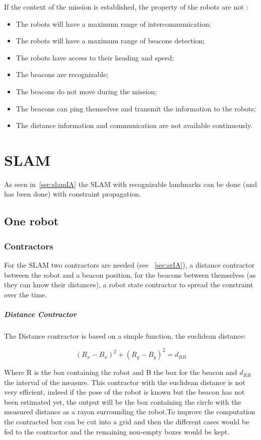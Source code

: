 If the context of the mission is established, the property of the robots are not :
  
\begin{itemize}[label=$-$,itemsep=0cm,topsep=0cm]
\item The robots will have a maximum range of intercommunication;
\item The robots will have a maximum range of beacons detection;
\item The robots have access to their heading and speed;
\item The beacons are recognizable;
\item The beacons do not move during the mission;
\item The beacons can ping themselves and transmit the information to the robots;
\item The distance information and communication are not available continuously.
\end{itemize}

\section{SLAM}

As seen in~\ref{sec:slamIA} the SLAM with recognizable landmarks can be done (and has been done) with constraint propagation.

\subsection{One robot}

\subsubsection*{Contractors}\label{sssec:contract}
For the SLAM two contractors are needed (see ~\ref{sec:srIA}), a distance contractor between the robot and a beacon position, for the beacons between themselves (as they can know their distances), a robot state contractor to spread the constraint over the time.

\subparagraph{Distance Contractor}
The Distance contractor is based on a simple function, the euclidean distance:

\begin{equation}
(R_{x}-B_{x})^{2}+(R_{y}-B_{y})^{2} = d_{RB} 
\end{equation}

Where R is the box containing the robot and B the box for the beacon and $d_{RB}$ the interval of the measure. This contractor with the euclidean distance is not very efficient, indeed if the pose of the robot is known but the beacon has not been estimated yet, the output will be the box containing the circle with the measured distance as a rayon surrounding the robot.To improve the computation the contracted box can be cut into a grid and then the different cases would be fed to the contractor and the remaining non-empty boxes would be kept.


